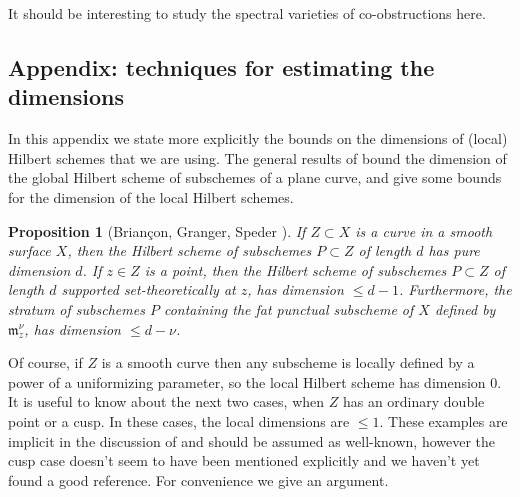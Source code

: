 \documentclass{amsart}
\theoremstyle{plain}
\newtheorem{proposition}[theorem]{Proposition}
\numberwithin{equation}{section}
\begin{document}
It should be interesting to study the spectral varieties of co-obstructions here.

\subsection{Appendix: techniques for estimating the dimensions}
\label{appendix}

In this appendix we state more explicitly the bounds on the dimensions of (local)
Hilbert schemes that we are using. 
The general results of  \cite{BGS} bound the dimension of the global
Hilbert scheme of subschemes of a plane curve, and give some bounds for the 
dimension of the local Hilbert schemes. 

\begin{proposition}[Brian\c{c}on, Granger, Speder \cite{BGS}]
If $Z\subset X$ is a curve in a smooth surface $X$, then the Hilbert scheme of
subschemes $P\subset Z$ of length $d$ has pure dimension $d$. If $z\in Z$
is a point, then the Hilbert scheme of subschemes $P\subset Z$ of length $d$ 
supported set-theoretically at $z$, has dimension $\leq d-1$. Furthermore,
the stratum of subschemes $P$ containing the fat punctual
subscheme of $X$ defined by $\mathfrak{m}_z ^{\nu}$, has dimension $\leq d-\nu$. 
\end{proposition}

Of course, if $Z$ is a smooth curve then any subscheme is locally defined by a
power of a uniformizing parameter, so the local Hilbert scheme has dimension $0$.
It is useful to know about the next two cases, 
when $Z$ has an ordinary double point or a cusp. In these cases, 
the local dimensions are $\leq 1$. These examples are implicit in
the discussion of \cite{BGS} and should be assumed as well-known, 
however the cusp case doesn't seem to
have been mentioned explicitly and we haven't yet found a good reference. For convenience we give an argument.
\end{document}
